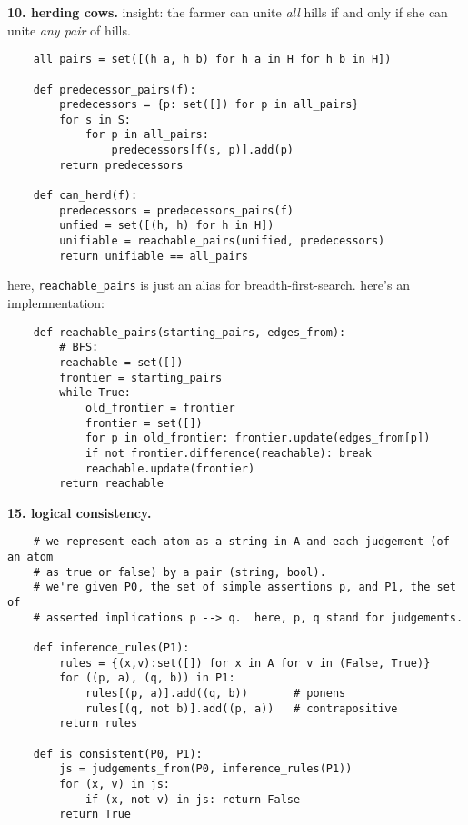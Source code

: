 \documentclass{article}
\newcommand{\cd}{\texttt}
\begin{document}
\newpage
    \par\noindent\hspace{-1cm}
    \textbf{10. herding cows.}
        insight: the farmer can unite \emph{all} hills if and only if
                 she can unite \emph{any pair} of hills.
\begin{verbatim}
    all_pairs = set([(h_a, h_b) for h_a in H for h_b in H])

    def predecessor_pairs(f):
        predecessors = {p: set([]) for p in all_pairs}
        for s in S:
            for p in all_pairs:
                predecessors[f(s, p)].add(p)
        return predecessors

    def can_herd(f): 
        predecessors = predecessors_pairs(f)
        unfied = set([(h, h) for h in H])
        unifiable = reachable_pairs(unified, predecessors) 
        return unifiable == all_pairs
\end{verbatim}

\vfill
\noindent here, \cd{reachable\_pairs} is just an alias for
breadth-first-search.  here's an implemnentation:
\begin{verbatim}
    def reachable_pairs(starting_pairs, edges_from):
        # BFS: 
        reachable = set([])
        frontier = starting_pairs
        while True:
            old_frontier = frontier
            frontier = set([])
            for p in old_frontier: frontier.update(edges_from[p]) 
            if not frontier.difference(reachable): break
            reachable.update(frontier)
        return reachable
\end{verbatim}

\newpage
    \par\noindent\hspace{-1cm}
    \textbf{15. logical consistency.}

\begin{verbatim}
    # we represent each atom as a string in A and each judgement (of an atom
    # as true or false) by a pair (string, bool).
    # we're given P0, the set of simple assertions p, and P1, the set of
    # asserted implications p --> q.  here, p, q stand for judgements.

    def inference_rules(P1):
        rules = {(x,v):set([]) for x in A for v in (False, True)}
        for ((p, a), (q, b)) in P1:
            rules[(p, a)].add((q, b))       # ponens
            rules[(q, not b)].add((p, a))   # contrapositive
        return rules

    def is_consistent(P0, P1):
        js = judgements_from(P0, inference_rules(P1))
        for (x, v) in js:
            if (x, not v) in js: return False
        return True
\end{verbatim}
\end{document}
